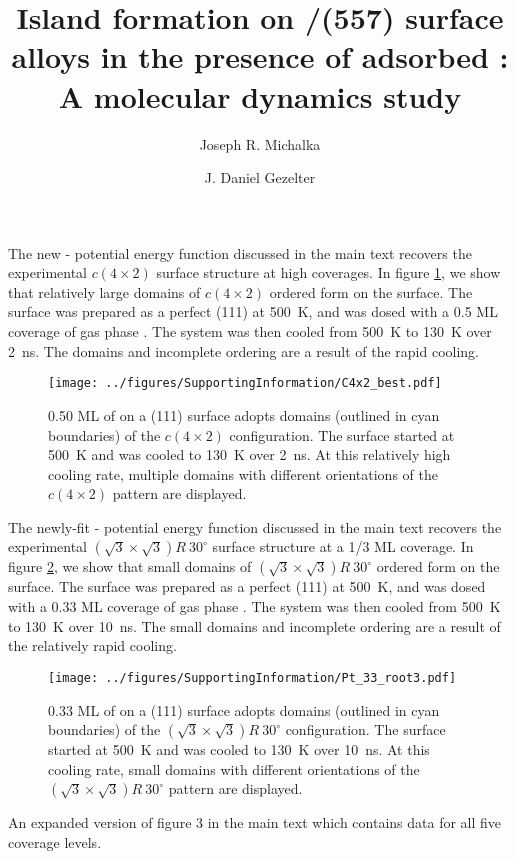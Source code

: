 \documentclass[journal = jpccck, manuscript = suppinfo]{achemso}
\title{Island formation on \ce{Pt}/\ce{Pd}(557) surface alloys in the presence
of adsorbed \ce{CO}: A molecular dynamics study}
\author{Joseph R. Michalka}
\author{J. Daniel Gezelter}
\affiliation[University of Notre Dame]{251 Nieuwland Science Hall\\
  Department of Chemistry and Biochemistry\\ University of Notre
  Dame\\ Notre Dame, Indiana 46556}
\begin{document}
The new - potential energy function discussed in the
main text recovers the experimental $c(4 \times 2)$ surface structure
at high coverages.  In figure \ref{fig:C4x2}, we show that relatively
large domains of $c(4 \times 2)$ ordered  form on the surface.
The surface was prepared as a perfect (111) at 500~K, and was
dosed with a 0.5 ML coverage of gas phase .  The system was
then cooled from 500~K to 130~K over 2~ns.  The domains and incomplete
ordering are a result of the rapid cooling.

\begin{figure}
  \texttt{[image: ../figures/SupportingInformation/C4x2\_best.pdf]}
  \caption{0.50 ML of  on a (111) surface adopts domains
    (outlined in cyan boundaries) of the $c(4 \times 2)$
    configuration. The surface started at 500~K and was cooled to
    130~K over 2~ns.  At this relatively high cooling rate, multiple
    domains with different orientations of the $c(4 \times 2)$ pattern
    are displayed.}
\label{fig:C4x2}
\end{figure}

\newpage

The newly-fit - potential energy function discussed in
the main text recovers the experimental
$(\sqrt{3} \times \sqrt{3}) R~30^{\circ}$ surface structure at a 1/3
ML coverage.  In figure \ref{fig:Root3}, we show that small domains of
$(\sqrt{3} \times \sqrt{3}) R~30^{\circ}$ ordered  form on the
surface.  The surface was prepared as a perfect (111) at 500~K,
and was dosed with a 0.33 ML coverage of gas phase .  The
system was then cooled from 500~K to 130~K over 10~ns.  The small
domains and incomplete ordering are a result of the relatively rapid
cooling.

\begin{figure}
  \texttt{[image: ../figures/SupportingInformation/Pt\_33\_root3.pdf]}
  \caption{0.33 ML of  on a (111) surface adopts domains
    (outlined in cyan boundaries) of the
    $(\sqrt{3} \times \sqrt{3}) R~30^{\circ}$ configuration. The
    surface started at 500~K and was cooled to 130~K over 10~ns.  At
    this cooling rate, small domains with different orientations of
    the $(\sqrt{3} \times \sqrt{3}) R~30^{\circ}$ pattern are
    displayed.}
\label{fig:Root3}
\end{figure}

\newpage

An expanded version of figure 3 in the main text which contains data
for all five  coverage levels.
\end{document}
